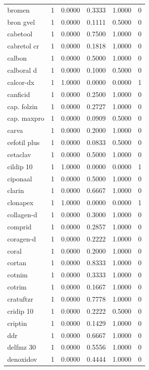 \begin{longtable}{p{3.0cm}rrrrr}
bromen & 1 & 0.0000 & 0.3333 & 1.0000 & 0 \\
bron gvel & 1 & 0.0000 & 0.1111 & 0.5000 & 0 \\
cabetool & 1 & 0.0000 & 0.7500 & 1.0000 & 0 \\
cabretol cr & 1 & 0.0000 & 0.1818 & 1.0000 & 0 \\
calbon & 1 & 0.0000 & 0.5000 & 1.0000 & 0 \\
calboral d & 1 & 0.0000 & 0.1000 & 0.5000 & 0 \\
calcor-dx & 1 & 1.0000 & 0.0000 & 0.0000 & 1 \\
canficid & 1 & 0.0000 & 0.2500 & 1.0000 & 0 \\
cap. folzin & 1 & 0.0000 & 0.2727 & 1.0000 & 0 \\
cap. maxpro & 1 & 0.0000 & 0.0909 & 0.5000 & 0 \\
carva & 1 & 0.0000 & 0.2000 & 1.0000 & 0 \\
cefotil plus & 1 & 0.0000 & 0.0833 & 0.5000 & 0 \\
cetaclav & 1 & 0.0000 & 0.5000 & 1.0000 & 0 \\
cildip 10 & 1 & 1.0000 & 0.0000 & 0.0000 & 1 \\
ciponaal & 1 & 0.0000 & 0.5000 & 1.0000 & 0 \\
clarin & 1 & 0.0000 & 0.6667 & 1.0000 & 0 \\
clonapex & 1 & 1.0000 & 0.0000 & 0.0000 & 1 \\
collagen-d & 1 & 0.0000 & 0.3000 & 1.0000 & 0 \\
comprid & 1 & 0.0000 & 0.2857 & 1.0000 & 0 \\
coragen-d & 1 & 0.0000 & 0.2222 & 1.0000 & 0 \\
coral & 1 & 0.0000 & 0.2000 & 1.0000 & 0 \\
cortan & 1 & 0.0000 & 0.8333 & 1.0000 & 0 \\
cotnim & 1 & 0.0000 & 0.3333 & 1.0000 & 0 \\
cotrim & 1 & 0.0000 & 0.1667 & 1.0000 & 0 \\
cratuftzr & 1 & 0.0000 & 0.7778 & 1.0000 & 0 \\
cridip 10 & 1 & 0.0000 & 0.2222 & 0.5000 & 0 \\
criptin & 1 & 0.0000 & 0.1429 & 1.0000 & 0 \\
ddr & 1 & 0.0000 & 0.6667 & 1.0000 & 0 \\
delfmz 30 & 1 & 0.0000 & 0.5556 & 1.0000 & 0 \\
denoxidov & 1 & 0.0000 & 0.4444 & 1.0000 & 0 \\

\end{longtable}
